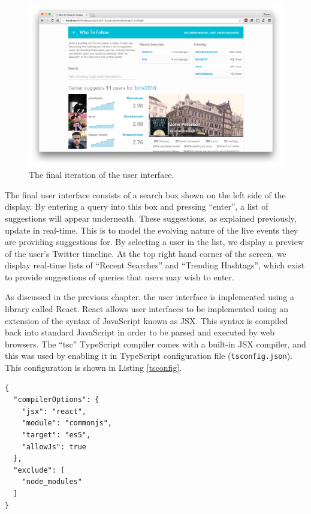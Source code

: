 \documentclass{l4proj}
\newcommand{\code}[1]{\texttt{#1}}
\begin{document}
\begin{figure}[H]
\centering
\includegraphics[scale=0.17]{finalscreenshot.png}
\caption{The final iteration of the user interface.}
\label{finalscreenshot}
\end{figure}

The final user interface consists of a search box shown on the left side of the display. By entering a query into this box and pressing ``enter'', a list of suggestions will appear underneath. These suggestions, as explained previously, update in real-time. This is to model the evolving nature of the live events they are providing suggestions for. By selecting a user in the list, we display a preview of the user's Twitter timeline. At the top right hand corner of the screen, we display real-time lists of ``Recent Searches'' and ``Trending Hashtags'', which exist to provide suggestions of queries that users may wish to enter.

    As discussed in the previous chapter, the user interface is implemented using a library called React. React allows user interfaces to be implemented using an extension of the syntax of JavaScript known as JSX. This syntax is compiled back into standard JavaScript in order to be parsed and executed by web browsers. The ``tsc'' TypeScript compiler comes with a built-in JSX compiler, and this was used by enabling it in TypeScript configuration file (\code{tsconfig.json}). This configuration is shown in Listing \ref{tsconfig}.
    
\begin{lstlisting}[label=tsconfig,caption=TypeScript compiler configuration.]
{
  "compilerOptions": {
    "jsx": "react",
    "module": "commonjs",
    "target": "es5",
    "allowJs": true
  },
  "exclude": [
    "node_modules"
  ]
}
\end{lstlisting}
\end{document}
